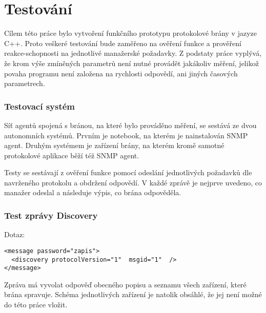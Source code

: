 \chapter{Testování}
\label{kap_testovani}
Cílem této práce bylo vytvoření funkčního prototypu protokolové brány v jazyze C++. Proto
veškeré testování bude zaměřeno na ověření funkce a prověření reakce-schopnosti na jednotlivé
manažerské požadavky. Z podstaty práce vyplývá, že krom výše zmíněných parametrů není nutné provádět
jakákoliv měření, jelikož povaha programu není založena na rychlosti odpovědí, ani jiných časových parametrech.

\subsection*{Testovací systém}
Síť agentů spojená s bránou, na které bylo prováděno měření, se sestává ze dvou autonomních systémů.
Prvním je notebook, na kterém je nainstalován SNMP agent. Druhým systémem je zařízení brány, na kterém
kromě samotné protokolové aplikace běží též SNMP agent.

Testy se sestávají z ověření funkce pomocí odeslání jednotlivých požadavků dle navrženého protokolu a obdržení odpovědí.
V každé zprávě je nejprve uvedeno, co manažer odeslal a následuje výpis, co brána odpověděla.

\subsection*{Test zprávy Discovery}
Dotaz:
\begin{verbatim}
<message password="zapis">
  <discovery protocolVersion="1"  msgid="1"  />
</message>
\end{verbatim}

Zpráva má vyvolat odpověď obecného popisu a seznamu všech zařízení, které brána spravuje. Schéma
jednotlivých zařízení je natolik obsáhlé, že jej není možné do této práce vložit.

